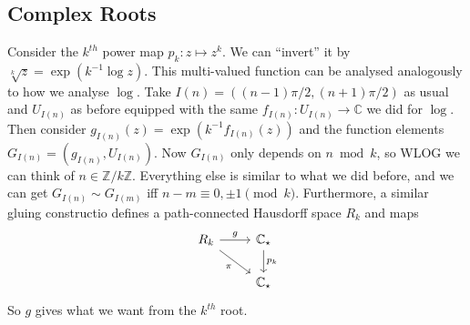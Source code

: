 \subsection{Complex Roots}
Consider the $k^{th}$ power map $p_k:z\mapsto z^k$.
We can ``invert'' it by $\sqrt[k]{z}=\exp(k^{-1}\log z)$.
This multi-valued function can be analysed analogously to how we analyse $\log$.
Take $I(n)=((n-1)\pi/2,(n+1)\pi/2)$ as usual and $U_{I(n)}$ as before equipped with the same $f_{I(n)}:U_{I(n)}\to\mathbb C$ we did for $\log$.
Then consider $g_{I(n)}(z)=\exp(k^{-1}f_{I(n)}(z))$ and the function elements $G_{I(n)}=(g_{I(n)},U_{I(n)})$.
Now $G_{I(n)}$ only depends on $n\bmod k$, so WLOG we can think of $n\in\mathbb Z/k\mathbb Z$.
Everything else is similar to what we did before, and we can get $G_{I(n)}\sim G_{I(m)}$ iff $n-m\equiv 0,\pm 1\pmod{k}$.
Furthermore, a similar gluing constructio defines a path-connected Hausdorff space $R_k$ and maps
\[
    \begin{tikzcd}
        R_k\arrow{r}{g}\arrow[swap]{dr}{\pi}&\mathbb C_\star\arrow{d}{p_k}\\
        &\mathbb C_\star
    \end{tikzcd}
\]
So $g$ gives what we want from the $k^{th}$ root.